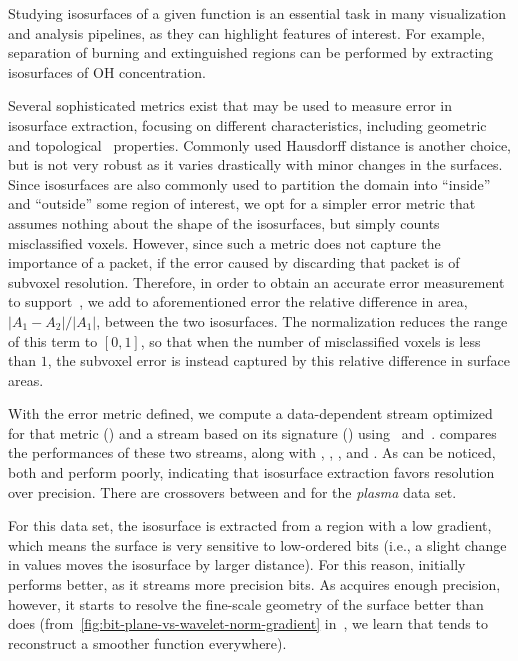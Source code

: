 Studying isosurfaces of a given function is an essential task in many visualization and analysis
pipelines, as they can highlight features of interest. For example, separation of burning and
extinguished regions can be performed by extracting isosurfaces of OH concentration.

Several sophisticated metrics exist that may be used to measure error in isosurface extraction,
focusing on different characteristics, including geometric~\cite{verifiable-isosurface} and
topological~\cite{topology-verification-isosurface} properties. Commonly used Hausdorff distance is
another choice, but is not very robust as it varies drastically with minor changes in the surfaces.
Since isosurfaces are also commonly used to partition the domain into ``inside'' and ``outside''
some region of interest, we opt for a simpler error metric that assumes nothing about the shape of
the isosurfaces, but simply counts misclassified voxels. However, since such a metric does not
capture the importance of a packet, if the error caused by discarding that packet is of subvoxel
resolution. Therefore, in order to obtain an accurate error measurement to
support~, we add to aforementioned error the relative difference in area,
$|A_1-A_2|/|A_1|$, between the two isosurfaces. The normalization reduces the range of this term to
$[0, 1]$, so that when the number of misclassified voxels is less than $1$, the subvoxel error is
instead captured by this relative difference in surface areas.

With the error metric defined, we compute a data-dependent stream optimized for that metric (\siop)
and a stream based on its signature (\sisg) using~ and~.
 compares the performances of these two streams, along with \sbit, \slvl,
\swav, and \smag. As can be noticed, both \slvl and \smag perform poorly, indicating that
isosurface extraction favors resolution over precision. There are crossovers between \sbit and \swav
for the \emph{plasma} data set.

For this data set, the isosurface is extracted from a region with a low gradient, which means the
surface is very sensitive to low-ordered bits (i.e., a slight change in values moves the isosurface
by larger distance). For this reason, \swav initially performs better, as it streams more precision
bits. As \sbit acquires enough precision, however, it starts to resolve the fine-scale geometry of
the surface better than \swav does (from~\autoref{fig:bit-plane-vs-wavelet-norm-gradient}
in~, we learn that \swav tends to reconstruct a smoother function everywhere).


